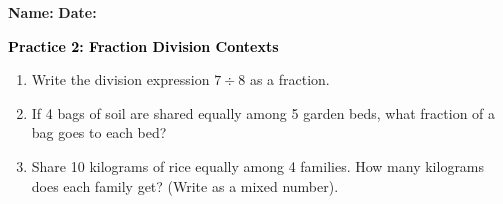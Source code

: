 \documentclass[12pt, letterpaper, fleqn]{article}
\begin{document}
\textbf{Name:} \underline{\hspace{5cm}}
\hfill
\textbf{Date:} \underline{\hspace{3cm}}\\

\begin{tcolorbox}[colback=customteal!20]
    \large\textcolor{black}{\textbf{Practice 2: Fraction Division Contexts}}
\end{tcolorbox}
\begin{enumerate}[itemsep=3.5cm, leftmargin=0.6cm]
\item Write the division expression $7 \div 8$ as a fraction.
\vspace{3.5cm}
\item If 4 bags of soil are shared equally among 5 garden beds, what fraction of a bag goes to each bed?
\vspace{3.5cm}
\item Share 10 kilograms of rice equally among 4 families. How many kilograms does each family get? (Write as a mixed number).
\end{enumerate}
\end{document}
